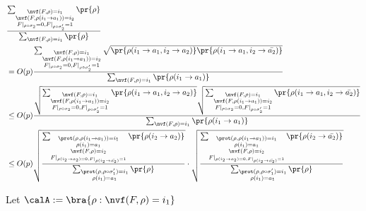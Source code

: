 \begin{align*}
    &\frac{ \stwo \pr{\rho} } { \sone \pr{\rho} } \\
    &= O(p) \frac{ \stwo \sqrt{\pr{\rhotwo} \pr{\rhotwoprime} }}{ \sone  \pr{\rhoone} }\\
    &\leq O(p) \frac{ \sqrt{\stwo \pr{\rhotwo}} \sqrt{ \stwo \pr{\rhotwoprime}}}{\sone \pr{\rhoone}}\\
    &\leq O(p) \sqrt{ \frac{  \sstwo \pr{\rho(i_2 \to a_2)} }{  \ssone \pr{\rho}  } } 
    \cdot \sqrt{ \frac{  \sstwo \pr{\rho(i_2 \to \bar{a_2})} }{  \ssone \pr{\rho}  } }
\end{align*}



Let $\calA: = \bra{\rho: \nvf(F,\rho) = i_1}$
